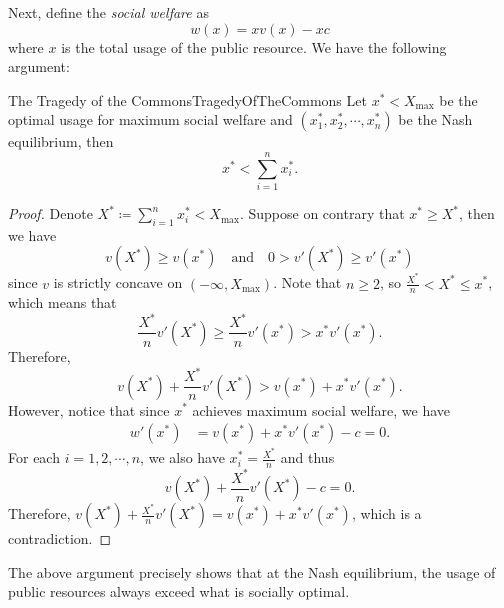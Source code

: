 \documentclass[math]{amznotes}
\theoremstyle{remark}
\begin{document}
Next, define the \textit{social welfare} as
\begin{equation*}
    w\left(x\right) = xv\left(x\right) - xc
\end{equation*}
where $x$ is the total usage of the public resource. We have the following argument:
\begin{probox}{The Tragedy of the Commons}{TragedyOfTheCommons}
    Let $x^* < X_{\max}$ be the optimal usage for maximum social welfare and $\left(x_1^*, x_2^*, \cdots, x_n^*\right)$ be the Nash equilibrium, then
    \begin{equation*}
        x^* < \sum_{i = 1}^{n}x_i^*.
    \end{equation*}
    \tcblower
    \begin{proof}
        Denote $X^* \coloneqq \sum_{i = 1}^{n}x_i^* < X_{\max}$. Suppose on contrary that $x^* \geq X^*$, then we have 
        \begin{equation*}
            v\left(X^*\right) \geq v\left(x^*\right) \quad\textrm{and}\quad 0 > v'\left(X^*\right) \geq v'\left(x^*\right)
        \end{equation*}
        since $v$ is strictly concave on $\left(-\infty, X_{\max}\right)$. Note that $n \geq 2$, so $\frac{X^*}{n} < X^* \leq x^*$, which means that 
        \begin{equation*}
            \frac{X^*}{n}v'\left(X^*\right) \geq \frac{X^*}{n}v'\left(x^*\right) > x^*v'\left(x^*\right).
        \end{equation*}
        Therefore, 
        \begin{equation*}
            v\left(X^*\right) + \frac{X^*}{n}v'\left(X^*\right) > v\left(x^*\right) + x^*v'\left(x^*\right).
        \end{equation*}
        However, notice that since $x^*$ achieves maximum social welfare, we have 
        \begin{align*}
            w'\left(x^*\right) & = v\left(x^*\right) + x^*v'\left(x^*\right) - c = 0.
        \end{align*}
        For each $i = 1, 2, \cdots, n$, we also have $x_i^* = \frac{X^*}{n}$ and thus
        \begin{equation*}
            v\left(X^*\right) + \frac{X^*}{n}v'\left(X^*\right) - c = 0.
        \end{equation*}
        Therefore, $v\left(X^*\right) + \frac{X^*}{n}v'\left(X^*\right) = v\left(x^*\right) + x^*v'\left(x^*\right)$, which is a contradiction.
    \end{proof}
\end{probox}
The above argument precisely shows that at the Nash equilibrium, the usage of public resources always exceed what is socially optimal.
\end{document}
